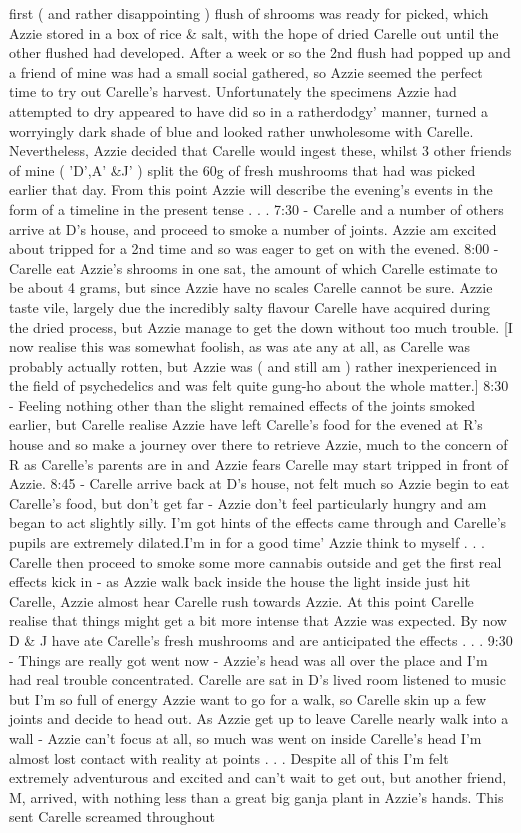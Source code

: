 \documentclass[12pt]{book}
\begin{document}
first ( and rather disappointing ) flush of shrooms was ready for picked, which Azzie stored in a box of rice \& salt, with the hope of dried Carelle out until the other flushed had developed. After a week or so the 2nd flush had popped up and a friend of mine was had a small social gathered, so Azzie seemed the perfect time to try out Carelle's harvest. Unfortunately the specimens Azzie had attempted to dry appeared to have did so in a ratherdodgy' manner, turned a worryingly dark shade of blue and looked rather unwholesome with Carelle. Nevertheless, Azzie decided that Carelle would ingest these, whilst 3 other friends of mine ( 'D',A' \&J' ) split the 60g of fresh mushrooms that had was picked earlier that day. From this point Azzie will describe the evening's events in the form of a timeline in the present tense . . .  7:30 - Carelle and a number of others arrive at D's house, and proceed to smoke a number of joints. Azzie am excited about tripped for a 2nd time and so was eager to get on with the evened. 8:00 - Carelle eat Azzie's shrooms in one sat, the amount of which Carelle estimate to be about 4 grams, but since Azzie have no scales Carelle cannot be sure. Azzie taste vile, largely due the incredibly salty flavour Carelle have acquired during the dried process, but Azzie manage to get the down without too much trouble. [I now realise this was somewhat foolish, as was ate any at all, as Carelle was probably actually rotten, but Azzie was ( and still am ) rather inexperienced in the field of psychedelics and was felt quite gung-ho about the whole matter.] 8:30 - Feeling nothing other than the slight remained effects of the joints smoked earlier, but Carelle realise Azzie have left Carelle's food for the evened at R's house and so make a journey over there to retrieve Azzie, much to the concern of R as Carelle's parents are in and Azzie fears Carelle may start tripped in front of Azzie. 8:45 - Carelle arrive back at D's house, not felt much so Azzie begin to eat Carelle's food, but don't get far - Azzie don't feel particularly hungry and am began to act slightly silly. I'm got hints of the effects came through and Carelle's pupils are extremely dilated.I'm in for a good time' Azzie think to myself . . .  Carelle then proceed to smoke some more cannabis outside and get the first real effects kick in - as Azzie walk back inside the house the light inside just hit Carelle, Azzie almost hear Carelle rush towards Azzie. At this point Carelle realise that things might get a bit more intense that Azzie was expected. By now D \& J have ate Carelle's fresh mushrooms and are anticipated the effects . . .  9:30 - Things are really got went now - Azzie's head was all over the place and I'm had real trouble concentrated. Carelle are sat in D's lived room listened to music but I'm so full of energy Azzie want to go for a walk, so Carelle skin up a few joints and decide to head out. As Azzie get up to leave Carelle nearly walk into a wall - Azzie can't focus at all, so much was went on inside Carelle's head I'm almost lost contact with reality at points . . .  Despite all of this I'm felt extremely adventurous and excited and can't wait to get out, but another friend, M, arrived, with nothing less than a great big ganja plant in Azzie's hands. This sent Carelle screamed throughout 
\end{document}
